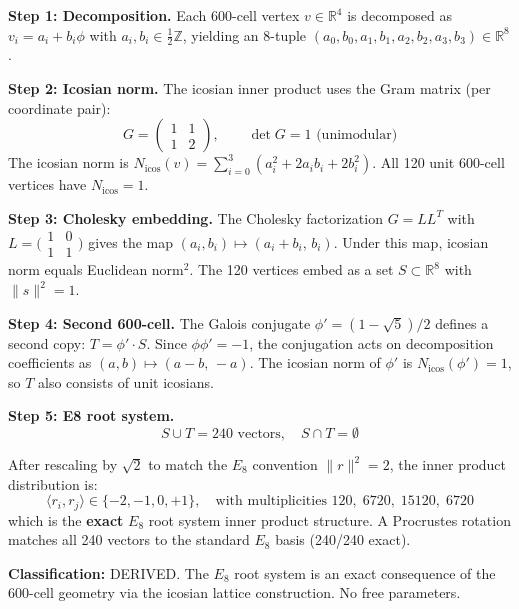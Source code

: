\documentclass[12pt,a4paper]{article}
\begin{document}
\textbf{Step 1: Decomposition.} Each 600-cell vertex $v \in \mathbb{R}^4$ is decomposed as $v_i = a_i + b_i\phi$ with $a_i, b_i \in \frac{1}{2}\mathbb{Z}$, yielding an 8-tuple $(a_0, b_0, a_1, b_1, a_2, b_2, a_3, b_3) \in \mathbb{R}^8$.

\textbf{Step 2: Icosian norm.} The icosian inner product uses the Gram matrix (per coordinate pair):
\begin{equation}
G = \begin{pmatrix} 1 & 1 \\ 1 & 2 \end{pmatrix}, \qquad \det G = 1 \text{ (unimodular)}
\end{equation}
The icosian norm is $N_{\text{icos}}(v) = \sum_{i=0}^{3}(a_i^2 + 2a_i b_i + 2b_i^2)$. All 120 unit 600-cell vertices have $N_{\text{icos}} = 1$.

\textbf{Step 3: Cholesky embedding.} The Cholesky factorization $G = LL^T$ with $L = \bigl(\begin{smallmatrix}1&0\\1&1\end{smallmatrix}\bigr)$ gives the map $(a_i, b_i) \mapsto (a_i + b_i,\, b_i)$. Under this map, icosian norm equals Euclidean norm$^2$. The 120 vertices embed as a set $S \subset \mathbb{R}^8$ with $\|s\|^2 = 1$.

\textbf{Step 4: Second 600-cell.} The Galois conjugate $\phi' = (1-\sqrt{5})/2$ defines a second copy: $T = \phi' \cdot S$. Since $\phi\phi' = -1$, the conjugation acts on decomposition coefficients as $(a,b) \mapsto (a-b,\,-a)$. The icosian norm of $\phi'$ is $N_{\text{icos}}(\phi') = 1$, so $T$ also consists of unit icosians.

\textbf{Step 5: E8 root system.}
\begin{equation}
\boxed{S \cup T = 240 \text{ vectors}, \quad S \cap T = \emptyset}
\end{equation}

After rescaling by $\sqrt{2}$ to match the $E_8$ convention $\|r\|^2 = 2$, the inner product distribution is:
\begin{equation}
\langle r_i, r_j \rangle \in \{-2, -1, 0, +1\}, \quad \text{with multiplicities } 120,\; 6720,\; 15120,\; 6720
\end{equation}
which is the \textbf{exact} $E_8$ root system inner product structure. A Procrustes rotation matches all 240 vectors to the standard $E_8$ basis (240/240 exact).

\textbf{Classification:} DERIVED. The $E_8$ root system is an exact consequence of the 600-cell geometry via the icosian lattice construction. No free parameters.
\end{document}
